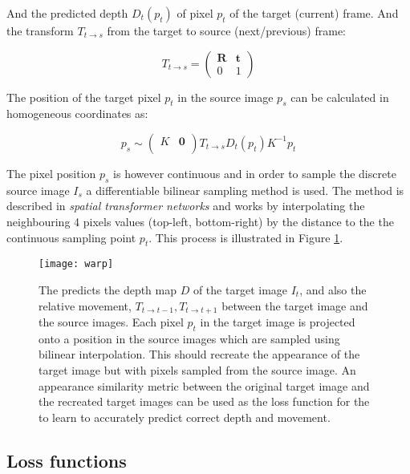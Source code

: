 And the predicted depth $ D_t(p_t) $ of pixel $ p_t $ of the target (current) frame. And the transform $ T_{t \rightarrow s} $ from the target to source (next/previous) frame:

\[
T_{t \rightarrow s} =
\begin{pmatrix}
\textbf{R} & \textbf{t} \\
0 & 1
\end{pmatrix}
\]

The position of the target pixel $ p_t $ in the source image $ p_s $ can be calculated in homogeneous coordinates as:

\[
p_s \sim 
\begin{pmatrix}
K  & \textbf{0} \\
\end{pmatrix}
T_{t \rightarrow s} D_t(p_t) K^{-1} p_t 
\]

The pixel position $ p_s $ is however continuous and in order to sample the discrete source image $ I_s $ a differentiable bilinear sampling method is used. The method is described in \textit{spatial transformer networks}\cite{spatialtransformernetworks} and works by interpolating the neighbouring 4 pixels values (top-left, bottom-right) by the distance to the the continuous sampling point $ p_t $. This process is illustrated in Figure \ref{fig:warp}.


\begin{figure}[H]
	\centering
	\texttt{[image: warp]}
	\caption{The \abbrCNN predicts the depth map $D$ of the target image $I_t$, and also the relative movement, $T_{t\rightarrow t-1}, T_{t\rightarrow t+1}$ between the target image and the source images. Each pixel $p_t$ in the target image is projected onto a position in the source images which are sampled using bilinear interpolation. This should recreate the appearance of the target image but with pixels sampled from the source image. An appearance similarity metric between the original target image and the recreated target images can be used as the loss function for the \abbrCNN to learn to accurately predict correct depth and movement.}
	\label{fig:warp}
\end{figure}



\subsection{Loss functions}
\label{sec:loss}

